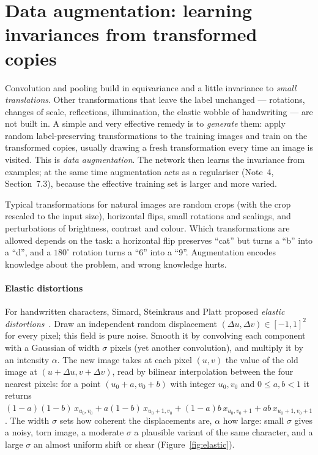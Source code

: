 \documentclass[11pt]{article}
\begin{document}
\section{Data augmentation: learning invariances from transformed copies}\label{sec:augment}

Convolution and pooling build in equivariance and a little invariance to \emph{small translations}. Other
transformations that leave the label unchanged --- rotations, changes of scale, reflections, illumination, the elastic
wobble of handwriting --- are not built in. A simple and very effective remedy is to \emph{generate} them: apply random
label-preserving transformations to the training images and train on the transformed copies, usually drawing a fresh
transformation every time an image is visited. This is \emph{data augmentation}. The network then learns the invariance
from examples; at the same time augmentation acts as a regulariser (Note~4, Section~7.3), because the effective training
set is larger and more varied.

Typical transformations for natural images are random crops (with the crop rescaled to the input size), horizontal
flips, small rotations and scalings, and perturbations of brightness, contrast and colour. Which transformations are
allowed depends on the task: a horizontal flip preserves ``cat'' but turns a ``b'' into a ``d'', and a $180^\circ$
rotation turns a ``6'' into a ``9''. Augmentation encodes knowledge about the problem, and wrong knowledge hurts.

\paragraph{Elastic distortions} For handwritten characters, Simard, Steinkraus and Platt proposed \emph{elastic
distortions}~\cite{simard2003}. Draw an independent random displacement $(\Delta u, \Delta v) \in [-1, 1]^2$ for every pixel;
this field is pure noise. Smooth it by convolving each component with a Gaussian of width $\sigma$ pixels (yet another
convolution), and multiply it by an intensity $\alpha$. The new image takes at each pixel $(u, v)$ the value of the old
image at $(u + \Delta u, v + \Delta v)$, read by bilinear interpolation between the four nearest pixels: for a point
$(u_0 + a, v_0 + b)$ with integer $u_0, v_0$ and $0 \le a, b < 1$ it returns $(1 - a)(1 - b)\,x_{u_0,v_0} + a(1 - b)\,
x_{u_0+1,v_0} + (1 - a)b\,x_{u_0,v_0+1} + ab\,x_{u_0+1,v_0+1}$. The width
$\sigma$ sets how coherent the displacements are, $\alpha$ how large: small $\sigma$ gives a noisy, torn image, a
moderate $\sigma$ a plausible variant of the same character, and a large $\sigma$ an almost uniform shift or shear
(Figure~\ref{fig:elastic}).
\end{document}
